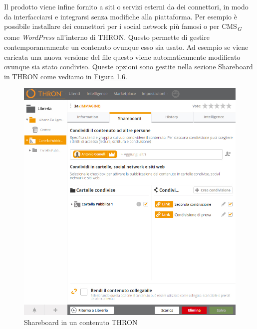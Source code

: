 \documentclass[a4paper, 12pt, twoside, openright]{book}
\newcommand{\gloss}[1]{#1\textsubscript{\textit{\tiny{G}}}}
\begin{document}
Il prodotto viene infine fornito a siti o servizi esterni da dei connettori, in modo da interfacciarsi e integrarsi senza modifiche alla piattaforma. Per esempio è possibile installare dei connettori per i social network più famosi o per \gloss{CMS} come \textit{WordPress} all'interno di THRON. Questo permette di gestire contemporaneamente un contenuto ovunque esso sia usato. Ad esempio se viene caricata una nuova versione del file questo viene automaticamente modificato ovunque sia stato condiviso. Queste opzioni sono gestite nella sezione Shareboard in THRON come vediamo in \hyperref[content-shareboard]{Figura 1.6}.\\ 
\begin{figure}[H]
	\centering
	\label{content-shareboard}
	\includegraphics[width=1.0\textwidth]{images/content-shareboard.jpg}
	\caption{Shareboard in un contenuto THRON}
\end{figure}
\end{document}
